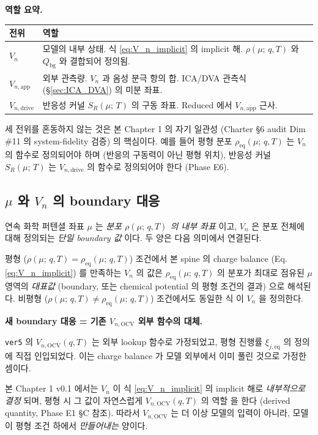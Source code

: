 \documentclass[11pt,a4paper]{article}
\newcommand{\OCV}{\mathrm{OCV}}
\newcommand{\app}{\mathrm{app}}
\newcommand{\drive}{\mathrm{drive}}
\newcommand{\eq}{\mathrm{eq}}
\newcommand{\bg}{\mathrm{bg}}
\newcommand{\mucont}{\mu}
\newcommand{\rhomu}{\rho(\mucont;\, q, T)}
\newcommand{\rhoeq}{\rho_{\eq}(\mucont;\, q, T)}
\newcommand{\Sreact}{S_R(\mucont;\, T)}
\begin{document}
\begin{mdframed}
\textbf{역할 요약.}

\begin{tabular}{p{} p{}}
\toprule
전위 & 역할 \\
\midrule
$V_n$ & 모델의 내부 상태. 식 \eqref{eq:V_n_implicit} 의 implicit 해. $\rhomu$ 와
        $Q_{\bg}$ 와 결합되어 정의됨. \\
$V_{n,\app}$ & 외부 관측량. $V_n$ 과 옴성 분극 항의 합. ICA/DVA 관측식
        (\S\ref{sec:ICA_DVA}) 의 미분 좌표. \\
$V_{n,\drive}$ & 반응성 커널 $\Sreact$ 의 구동 좌표. Reduced 에서 $V_{n,\app}$
        근사. \\
\bottomrule
\end{tabular}
\end{mdframed}

세 전위를 혼동하지 않는 것은 본 Chapter 1 의 자기 일관성 (Charter \S 6 audit
Dim \#11 의 system-fidelity 검증) 의 핵심이다. 예를 들어 평형 분포 $\rhoeq$ 는
$V_n$ 의 함수로 정의되어야 하며 (반응의 구동력이 아닌 평형 위치), 반응성 커널
$\Sreact$ 는 $V_{n,\drive}$ 의 함수로 정의되어야 한다 (Phase E6).

\subsection{$\mucont$ 와 $V_n$ 의 boundary 대응}
\label{sec:mu_V_n_correspondence}

연속 화학 퍼텐셜 좌표 $\mucont$ 는 \emph{분포 $\rhomu$ 의 내부 좌표} 이고,
$V_n$ 은 분포 전체에 대해 정의되는 \emph{단일 boundary 값} 이다. 두 양은 다음
의미에서 연결된다.

평형 ($\rhomu = \rhoeq$) 조건에서 본 spine 의 charge balance
(Eq.\,\ref{eq:V_n_implicit}) 를 만족하는 $V_n$ 의 값은 $\rhoeq$ 의 분포가 최대로
점유된 $\mucont$ 영역의 \emph{대표값} (boundary, 또는 chemical potential 의 평형
조건의 결과) 으로 해석된다. 비평형 ($\rhomu \neq \rhoeq$) 조건에서도 동일한 식
이 $V_n$ 을 정의한다.

\begin{mdframed}
\textbf{새 boundary 대응 = 기존 $V_{n,\OCV}$ 외부 함수의 대체.}

\texttt{ver5} 의 $V_{n,\OCV}(q, T)$ 는 외부 lookup 함수로 가정되었고, 평형 진행률
$\xi_{j,\eq}$ 의 정의에 직접 인입되었다. 이는 charge balance 가 모델 외부에서
이미 풀린 것으로 가정한 셈이다.

본 Chapter 1 v0.1 에서는 $V_n$ 이 식 \eqref{eq:V_n_implicit} 의 implicit 해로
\emph{내부적으로 결정} 되며, 평형 시 그 값이 자연스럽게 $V_{n,\OCV}(q, T)$ 의 역할
을 한다 (derived quantity, Phase E1 \S C 참조). 따라서 $V_{n,\OCV}$ 는 더 이상
모델의 입력이 아니라, 모델이 평형 조건 하에서 \emph{만들어내는} 양이다.
\end{mdframed}
\end{document}
